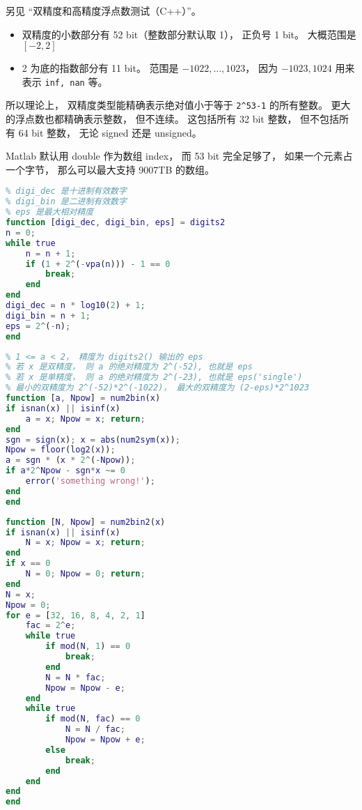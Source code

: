 
\begin{issues}
\issueDraft
\end{issues}


另见 “双精度和高精度浮点数测试（C++）”。

\begin{itemize}
\item 双精度的小数部分有 52 bit（整数部分默认取 1）， 正负号 1 bit。 大概范围是 $[-2,2]$
\item 2 为底的指数部分有 11 bit。 范围是 $-1022,\dots,1023$， 因为 $-1023, 1024$ 用来表示 \verb|inf, nan| 等。
\end{itemize}

所以理论上， 双精度类型能精确表示绝对值小于等于 \verb|2^53-1| 的所有整数。 更大的浮点数也都精确表示整数， 但不连续。 这包括所有 32 bit 整数， 但不包括所有 64 bit 整数， 无论 signed 还是 unsigned。

Matlab 默认用 double 作为数组 index， 而 53 bit 完全足够了， 如果一个元素占一个字节， 那么可以最大支持 9007TB 的数组。

\begin{lstlisting}[language=matlab, caption=digits2.m]
% 求当前 vpa 变精度计算的有效数字
% digi_dec 是十进制有效数字
% digi_bin 是二进制有效数字
% eps 是最大相对精度
function [digi_dec, digi_bin, eps] = digits2
n = 0;
while true
    n = n + 1;
    if (1 + 2^(-vpa(n))) - 1 == 0
        break;
    end
end
digi_dec = n * log10(2) + 1;
digi_bin = n + 1;
eps = 2^(-n);
end
\end{lstlisting}

\begin{lstlisting}[language=matlab, caption=num2bin.m]
% x = a*2^Npw (exactly)
% 1 <= a < 2， 精度为 digits2() 输出的 eps
% 若 x 是双精度， 则 a 的绝对精度为 2^(-52), 也就是 eps
% 若 x 是单精度， 则 a 的绝对精度为 2^(-23), 也就是 eps('single')
% 最小的双精度为 2^(-52)*2^(-1022)， 最大的双精度为 (2-eps)*2^1023
function [a, Npow] = num2bin(x)
if isnan(x) || isinf(x)
    a = x; Npow = x; return;
end
sgn = sign(x); x = abs(num2sym(x));
Npow = floor(log2(x));
a = sgn * (x * 2^(-Npow));
if a*2^Npow - sgn*x ~= 0
    error('something wrong!');
end
end
\end{lstlisting}

\begin{lstlisting}[language=matlab, caption=num2bin2.m]
% 精确解出 x = N*2^Npow， 其中 N 是奇数和整数, Npow 是整数
function [N, Npow] = num2bin2(x)
if isnan(x) || isinf(x)
    N = x; Npow = x; return;
end
if x == 0
    N = 0; Npow = 0; return;
end
N = x;
Npow = 0;
for e = [32, 16, 8, 4, 2, 1]
    fac = 2^e;
    while true
        if mod(N, 1) == 0
            break;
        end
        N = N * fac;
        Npow = Npow - e;
    end
    while true
        if mod(N, fac) == 0
            N = N / fac;
            Npow = Npow + e;
        else
            break;
        end
    end
end
end
\end{lstlisting}

